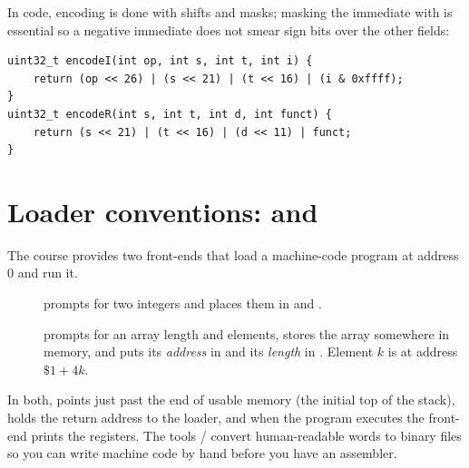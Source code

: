 In code, encoding is done with shifts and masks; masking the immediate with
 is essential so a negative immediate does not smear sign bits over the other
fields:
\begin{lstlisting}[style=cpp]
uint32_t encodeI(int op, int s, int t, int i) {
    return (op << 26) | (s << 21) | (t << 16) | (i & 0xffff);
}
uint32_t encodeR(int s, int t, int d, int funct) {
    return (s << 21) | (t << 16) | (d << 11) | funct;
}
\end{lstlisting}

\section{Loader conventions:  and }

The course provides two front-ends that load a machine-code program at address 0 and run it.

\begin{description}
  \item[] prompts for two integers and places them in  and
        .
  \item[] prompts for an array length and elements, stores the array
        somewhere in memory, and puts its \emph{address} in  and its \emph{length}
        in . Element $k$ is at address $\$1 + 4k$.
\end{description}

In both,  points just past the end of usable memory (the initial top of the
stack),  holds the return address to the loader, and when the program executes
 the front-end prints the registers. The tools  /
 convert human-readable words to binary files so you can write machine code
by hand before you have an assembler.

